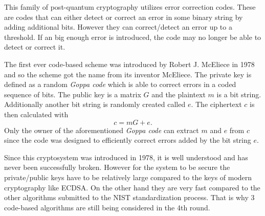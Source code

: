 This family of post-quantum cryptography utilizes error correction codes. These are codes that can either detect or correct an error in some binary string by adding additional bits. However they can correct/detect an error up to a threshold. If an big enough error is introduced, the code may no longer be able to detect or correct it.

The first ever code-based scheme was introduced by Robert J. McEliece in 1978 and so the scheme got the name from its inventor McEliece. The private key is defined as a random \textit{Goppa code} which is able to correct errors in a coded sequence of bits. The public key is a matrix $G$ and the plaintext $m$ is a bit string. Additionally another bit string is randomly created called $e$. The ciphertext $c$ is then calculated with
\begin{equation}
  c=mG+e.
\end{equation}
Only the owner of the aforementioned \textit{Goppa code} can extract $m$ and $e$ from $c$ since the code was designed to efficiently correct errors added by the bit string $e$. \cite{Bernstein149}

Since this cryptosystem was introduced in 1978, it is well understood and has never been successfully broken. However for the system to be secure the private/public keys have to be relatively large compared to the keys of modern cryptography like ECDSA. On the other hand they are very fast compared to the other algorithms submitted to the NIST standardization process. That is why 3 code-based algorithms are still being considered in the 4th round. \cite{Chen2016}

